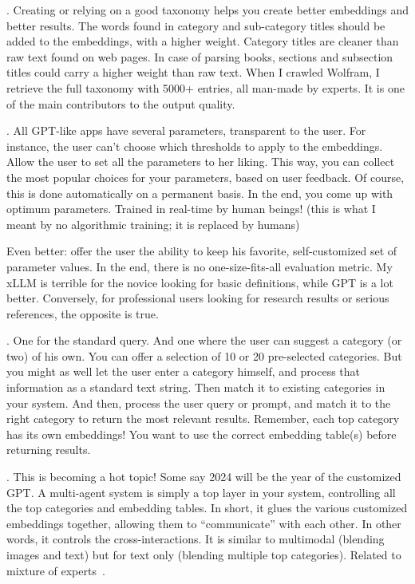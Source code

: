 \documentclass[oneside,10pt]{book}
\begin{document}
\vspace{1ex}
. Creating or relying on a good taxonomy helps you create better embeddings and better results. The words found in category and sub-category titles should be added to the embeddings, with a higher weight. Category titles are cleaner than raw text found on web pages. In case of parsing books, sections and subsection titles could carry a higher weight than raw text. When I crawled Wolfram, I retrieve the full taxonomy with 5000+ entries, all man-made by experts. It is one of the main contributors to the output quality.


\vspace{1ex}
. All GPT-like apps have several parameters, transparent to the user. For instance, the user can’t choose which thresholds to apply to the embeddings. Allow the user to set all the parameters to her liking. This way, you can collect the most popular choices for your parameters, based on user feedback. Of course, this is done automatically on a permanent basis. In the end, you come up with optimum parameters. Trained in real-time by human beings! (this is what I meant by no algorithmic training; it is replaced by humans)

Even better: offer the user the ability to keep his favorite, self-customized set of parameter values. In the end, there is no one-size-fits-all evaluation metric. My xLLM is terrible for the novice looking for basic definitions, while GPT is a lot better. Conversely, for professional users looking for research results or serious references, the opposite is true.

\vspace{1ex}
. One for the standard query. And one where the user can suggest a category (or two) of his own. You can offer a selection of 10 or 20 pre-selected categories. But you might as well let the user enter a category himself, and process that information as a standard text string. Then match it to existing categories in your system. And then, process the user query or prompt, and match it to the right category to return the most relevant results. Remember, each top category has its own embeddings! You want to use the correct embedding table(s) before returning results.

\vspace{1ex}
. This is becoming a hot topic! Some say 2024 will be the year of the customized GPT. A 
\textcolor{index}{multi-agent system} is simply a top layer in your system, controlling all the top categories and embedding tables. In short, it glues the various customized embeddings together, allowing them to “communicate” with each other. In other words, it controls the cross-interactions. It is similar to multimodal (blending images and text) but for text only (blending multiple top categories). Related to \textcolor{index}{mixture of experts}~\cite{mexperts}. 
\end{document}
